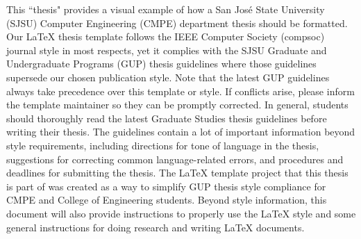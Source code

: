 This ``thesis" provides a visual example of how a San Jos\'{e} State University (SJSU) Computer Engineering (CMPE) department thesis should be formatted. Our LaTeX thesis template follows the IEEE Computer Society (compsoc) journal style in most respects, yet it complies with the SJSU Graduate and Undergraduate Programs (GUP) thesis guidelines where those guidelines supersede our chosen publication style. Note that the latest GUP guidelines always take precedence over this template or style. If conflicts arise, please inform the template maintainer so they can be promptly corrected. In general, students should thoroughly read the latest Graduate Studies thesis guidelines before writing their thesis. The guidelines contain a lot of important information beyond style requirements, including directions for tone of language in the thesis, suggestions for correcting common language-related errors, and procedures and deadlines for submitting the thesis. The LaTeX template project that this thesis is part of was created as a way to simplify GUP thesis style compliance for CMPE and College of Engineering students. Beyond style information, this document will also provide instructions to properly use the LaTeX style and some general instructions for doing research and writing LaTeX documents.